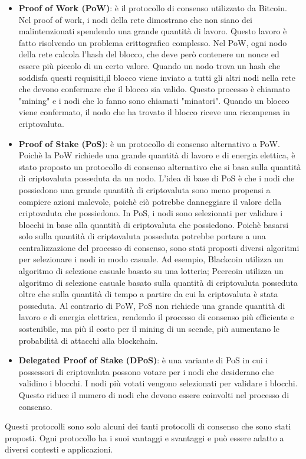 \documentclass[../../Thesis.tex]{subfiles}
\begin{document}
\begin{itemize}
    \item \textbf{Proof of Work (PoW)}: è il protocollo di consenso utilizzato da Bitcoin. Nel proof of work, i nodi della rete dimostrano che non siano dei malintenzionati spendendo una grande quantità di lavoro. Questo lavoro è fatto risolvendo un problema crittografico complesso. Nel PoW, ogni nodo della rete calcola l'hash del blocco, che deve però contenere un nonce ed essere più piccolo di un certo valore. Quando un nodo trova un hash che soddisfa questi requisiti,il blocco viene inviato a tutti gli altri nodi nella rete che devono confermare che il blocco sia valido. Questo processo è chiamato "mining" e i nodi che lo fanno sono chiamati "minatori". Quando un blocco viene confermato, il nodo che ha trovato il blocco riceve una ricompensa in criptovaluta.
    \item \textbf{Proof of Stake (PoS)}: è un protocollo di consenso alternativo a PoW. Poichè la PoW richiede una grande quantità di lavoro e di energia elettica, è stato proposto un protocollo di consenso alternativo che si basa sulla quantità di criptovaluta posseduta da un nodo. L'idea di base di PoS è che i nodi che possiedono una grande quantità di criptovaluta sono meno propensi a compiere azioni malevole, poichè ciò potrebbe danneggiare il valore della criptovaluta che possiedono. In PoS, i nodi sono selezionati per validare i blocchi in base alla quantità di criptovaluta che possiedono. Poichè basarsi solo sulla quantità di criptovaluta posseduta potrebbe portare a una centralizzazione del processo di consenso, sono stati proposti diversi algoritmi per selezionare i nodi in modo casuale. Ad esempio, Blackcoin \cite{Blackcoin} utilizza un algoritmo di selezione casuale basato su una lotteria; Peercoin \cite{Peercoin} utilizza un algoritmo di selezione casuale basato sulla quantità di criptovaluta posseduta oltre che sulla quantità di tempo a partire da cui la criptovaluta è stata posseduta. Al contrario di PoW, PoS non richiede una grande quantità di lavoro e di energia elettrica, rendendo il processo di consenso più efficiente e sostenibile, ma più il costo per il mining di un  scende, più aumentano le probabilità di attacchi alla blockchain. 
    \item \textbf{Delegated Proof of Stake (DPoS)}: è una variante di PoS in cui i possessori di criptovaluta possono votare per i nodi che desiderano che validino i blocchi. I nodi più votati vengono selezionati per validare i blocchi. Questo riduce il numero di nodi che devono essere coinvolti nel processo di consenso.
\end{itemize}
Questi protocolli sono solo alcuni dei tanti protocolli di consenso che sono stati proposti. Ogni protocollo ha i suoi vantaggi e svantaggi e può essere adatto a diversi contesti e applicazioni.
\end{document}
